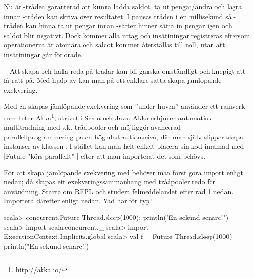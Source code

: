 \SOLUTION


\TaskSolved \what

Nu är -tråden garanterad att kunna ladda saldot, ta ut pengar/ändra och lagra innan -tråden kan skriva över resultatet. I  pausas tråden i en millisekund så -tråden kan hinna ta ut pengar innan -sätter hinner sätta in pengar igen och saldot blir negativt. Dock kommer alla uttag och insättningar registreras eftersom operationerna är atomära och saldot kommer återställas till noll, utan att insättningar går förlorade.


\QUESTEND







\QUESTBEGIN

\Task \label{task:future} \what~   Att skapa och hålla reda på trådar kan bli ganska omständligt och knepigt att få rätt på.
Med hjälp av  kan man på ett enklare sätta skapa jämlöpande exekvering.

\begin{Background}
Med en  skapas jämlöpande exekvering som ''under huven'' använder ett ramverk som heter Akka\footnote{\url{http://akka.io/}}, skrivet i Scala och Java. Akka erbjuder automatisk  multitrådning med s.k. trådpooler och möjliggör avancerad parallellprogrammering på en hög  abstraktionsnivå, där man själv slipper skapa instanser av klassen . I stället kan man helt enkelt placera sin kod inramad med \code|Future{ "körs parallellt" }| efter att man importerat det som behövs.
\end{Background}

\Subtask För att skapa jämlöpande exekvering med  behöver man först göra import enligt nedan; då skapas ett exekveringssammanhang med trådpooler redo för användning. Starta om REPL och studera felmeddelandet efter rad 1 nedan. Importera därefter enligt nedan. Vad har  för typ?
\begin{REPL}
scala> concurrent.Future { Thread.sleep(1000); println("En sekund senare!") }
scala> import scala.concurrent._
scala> import ExecutionContext.Implicits.global
scala> val f = Future { Thread.sleep(1000); println("En sekund senare!") }
\end{REPL}

